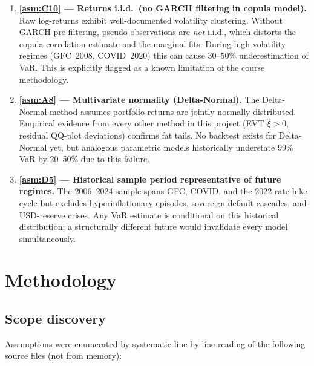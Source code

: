 \documentclass[11pt,a4paper]{article}
\begin{document}
\begin{enumerate}
  \item \textbf{\cref{asm:C10} --- Returns i.i.d.\ (no GARCH filtering in
    copula model).} Raw log-returns exhibit well-documented volatility
    clustering. Without GARCH pre-filtering, pseudo-observations are \emph{not}
    i.i.d., which distorts the copula correlation estimate and the marginal
    fits. During high-volatility regimes (GFC~2008, COVID~2020) this can
    cause 30--50\% underestimation of VaR. This is explicitly flagged as a
    known limitation of the course methodology.

  \item \textbf{\cref{asm:A8} --- Multivariate normality (Delta-Normal).}
    The Delta-Normal method assumes portfolio returns are jointly normally
    distributed. Empirical evidence from every other method in this project
    (EVT $\hat{\xi} > 0$, residual QQ-plot deviations) confirms fat tails.
    No backtest exists for Delta-Normal yet, but analogous parametric
    models historically understate 99\% VaR by 20--50\% due to this failure.

  \item \textbf{\cref{asm:D5} --- Historical sample period representative
    of future regimes.} The 2006--2024 sample spans GFC, COVID, and the
    2022 rate-hike cycle but excludes hyperinflationary episodes, sovereign
    default cascades, and USD-reserve crises. Any VaR estimate is
    conditional on this historical distribution; a structurally different
    future would invalidate every model simultaneously.
\end{enumerate}

\section{Methodology}\label{sec:methodology}

\subsection{Scope discovery}\label{sec:scope-discovery}

Assumptions were enumerated by systematic line-by-line reading of the
following source files (not from memory):
\end{document}
